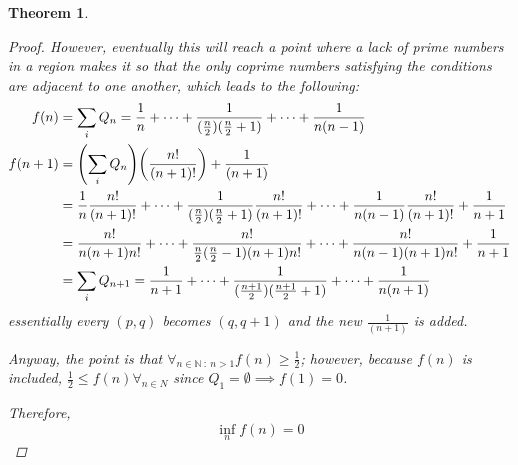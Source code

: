 \documentclass[]{article}
\newcommand{\N}{\mathbb{N}}
\newcommand{\st}{\ : \ }
\newtheorem{theorem}{Theorem}
\begin{document}
\begin{theorem}
\begin{proof}
        However, eventually this will reach a point where a lack of prime numbers in a region makes it so that the only coprime numbers satisfying the conditions are adjacent to one another, which leads to the following:
        \begin{align*}
            f(n)    &= \sum_{i} Q_n = \frac{1}{n} + \dots + \frac{1}{(\frac{n}{2}) (\frac{n}{2}+1)} + \dots + \frac{1}{n (n-1)}\\
            f(n+1)  &= \qty(\sum_{i} Q_n) \qty(\frac{n!}{(n+1)!}) + \frac{1}{(n+1)}\\
                    &= \frac{1}{n} \frac{n!}{(n+1)!} + \dots + \frac{1}{(\frac{n}{2}) (\frac{n}{2}+1)} \frac{n!}{(n+1)!} + \dots + \frac{1}{n (n-1)} \frac{n!}{(n+1)!} + \frac{1}{n+1}\\
                    &= \frac{n!}{n(n+1)n!} + \dots + \frac{n!}{\frac{n}{2}(\frac{n}{2}-1)(n+1)n!} + \dots + \frac{n!}{n (n-1) (n+1) n!} + \frac{1}{n+1}\\
                    &= \sum_{i} Q_{n+1} = \frac{1}{n+1} + \dots + \frac{1}{(\frac{n+1}{2}) (\frac{n+1}{2}+1)} + \dots + \frac{1}{n (n+1)}
        \end{align*}
        essentially every $(p,q)$ becomes $(q,q+1)$ and the new $\frac{1}{(n+1)}$ is added.


        Anyway, the point is that $\forall_{n\in\N \st n>1} f(n) \geq \frac{1}{2}$; 
        however, because $f(n)$ is included, $\frac{1}{2} \leq f(n) \forall_{n \in N}$ since $Q_1 = \emptyset \implies f(1) = 0$.

        Therefore,
        \[
            \inf_n f(n) = 0
        \]



\end{proof}
\end{theorem}
\end{document}
